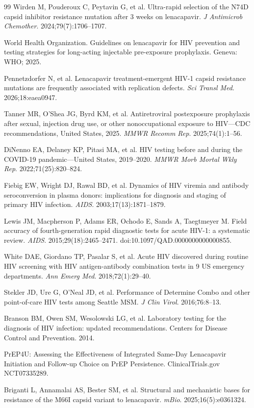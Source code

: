 \documentclass[12pt]{article}
\begin{document}
\begin{thebibliography}{99}
 Wirden M, Pouderoux C, Peytavin G, et al. Ultra-rapid selection of the N74D capsid inhibitor resistance mutation after 3 weeks on lenacapavir. \textit{J Antimicrob Chemother}. 2024;79(7):1706--1707.

 World Health Organization. Guidelines on lenacapavir for HIV prevention and testing strategies for long-acting injectable pre-exposure prophylaxis. Geneva: WHO; 2025.

 Pennetzdorfer N, et al. Lenacapavir treatment-emergent HIV-1 capsid resistance mutations are frequently associated with replication defects. \textit{Sci Transl Med}. 2026;18:eaea0947.

 Tanner MR, O'Shea JG, Byrd KM, et al. Antiretroviral postexposure prophylaxis after sexual, injection drug use, or other nonoccupational exposure to HIV---CDC recommendations, United States, 2025. \textit{MMWR Recomm Rep}. 2025;74(1):1--56.

 DiNenno EA, Delaney KP, Pitasi MA, et al. HIV testing before and during the COVID-19 pandemic---United States, 2019--2020. \textit{MMWR Morb Mortal Wkly Rep}. 2022;71(25):820--824.

 Fiebig EW, Wright DJ, Rawal BD, et al. Dynamics of HIV viremia and antibody seroconversion in plasma donors: implications for diagnosis and staging of primary HIV infection. \textit{AIDS}. 2003;17(13):1871--1879.

 Lewis JM, Macpherson P, Adams ER, Ochodo E, Sands A, Taegtmeyer M. Field accuracy of fourth-generation rapid diagnostic tests for acute HIV-1: a systematic review. \textit{AIDS}. 2015;29(18):2465--2471. doi:10.1097/QAD.0000000000000855.

 White DAE, Giordano TP, Pasalar S, et al. Acute HIV discovered during routine HIV screening with HIV antigen-antibody combination tests in 9 US emergency departments. \textit{Ann Emerg Med}. 2018;72(1):29--40.

 Stekler JD, Ure G, O'Neal JD, et al. Performance of Determine Combo and other point-of-care HIV tests among Seattle MSM. \textit{J Clin Virol}. 2016;76:8--13.

 Branson BM, Owen SM, Wesolowski LG, et al. Laboratory testing for the diagnosis of HIV infection: updated recommendations. Centers for Disease Control and Prevention. 2014.

 PrEP4U: Assessing the Effectiveness of Integrated Same-Day Lenacapavir Initiation and Follow-up Choice on PrEP Persistence. ClinicalTrials.gov NCT07335289.

 Briganti L, Annamalai AS, Bester SM, et al. Structural and mechanistic bases for resistance of the M66I capsid variant to lenacapavir. \textit{mBio}. 2025;16(5):e0361324.

\end{thebibliography}
\end{document}
